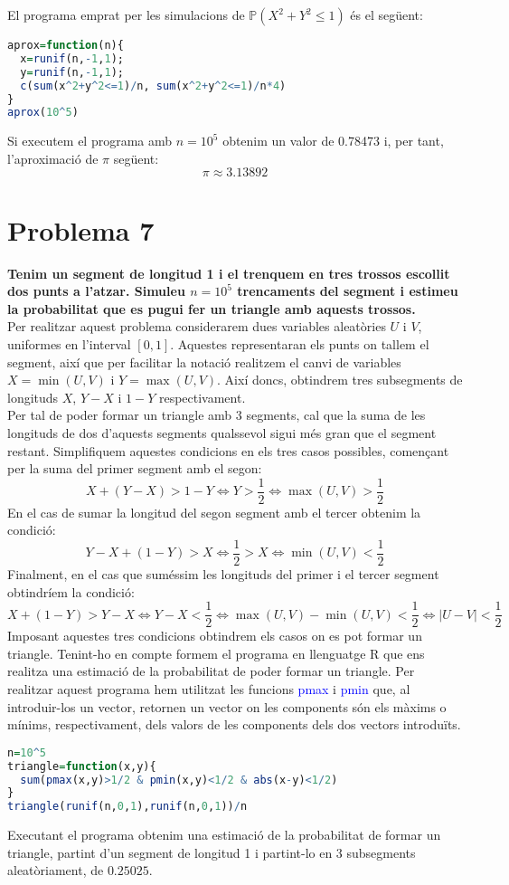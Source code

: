 \documentclass[11pt,a4paper]{article}
\begin{document}
El programa emprat per les simulacions de $\mathbb{P}(X^2+Y^2\leq1)$ és el següent:
\begin{lstlisting}[language=R,caption={Programa del problema 6},xleftmargin=.20\textwidth,xrightmargin=.20\textwidth]
aprox=function(n){
  x=runif(n,-1,1);
  y=runif(n,-1,1);
  c(sum(x^2+y^2<=1)/n, sum(x^2+y^2<=1)/n*4)
}
aprox(10^5)
\end{lstlisting}
Si executem el programa amb $n=10^5$ obtenim un valor de 0.78473 i, per tant, l'aproximació de $\pi$ següent: $$\pi\approx 3.13892$$

\section*{Problema 7}
\textbf{Tenim un segment de longitud 1 i el trenquem en tres trossos escollit dos punts a l'atzar. Simuleu $n=10^5$ trencaments del segment i estimeu la probabilitat que es pugui fer un triangle amb aquests trossos.}\\
Per realitzar aquest problema considerarem dues variables aleatòries $U$ i $V$, uniformes en l'interval $[0,1]$. Aquestes representaran els punts on tallem el segment, així que per facilitar la notació realitzem el canvi de variables $X=\min(U,V)$ i $Y=\max(U,V)$. Així doncs, obtindrem tres subsegments de longituds $X$, $Y-X$ i $1-Y$ respectivament.\\
Per tal de poder formar un triangle amb 3 segments, cal que la suma de les longituds de dos d'aquests segments qualssevol sigui més gran que el segment restant. Simplifiquem aquestes condicions en els tres casos possibles, començant per la suma del primer segment amb el segon:
$$X+(Y-X)>1-Y\Longleftrightarrow Y>\frac{1}{2}\Longleftrightarrow \max(U,V)>\frac{1}{2}$$
En el cas de sumar la longitud del segon segment amb el tercer obtenim la condició:
$$Y-X+(1-Y)>X\Longleftrightarrow\frac{1}{2}>X\Longleftrightarrow \min(U,V)<\frac{1}{2}$$
Finalment, en el cas que suméssim les longituds del primer i el tercer segment obtindríem la condició:
$$X+(1-Y)>Y-X\Longleftrightarrow Y-X<\frac{1}{2}\Longleftrightarrow \max(U,V)-\min(U,V)<\frac{1}{2}\Longleftrightarrow |U-V|<\frac{1}{2}$$
Imposant aquestes tres condicions obtindrem els casos on es pot formar un triangle. Tenint-ho en compte formem el programa en llenguatge R que ens realitza una estimació de la probabilitat de poder formar un triangle. Per realitzar aquest programa hem utilitzat les funcions \textcolor{blue}{pmax} i \textcolor{blue}{pmin} que, al introduir-los un vector, retornen un vector on les components són els màxims o mínims, respectivament, dels valors de les components dels dos vectors introduïts.
\begin{lstlisting}[language=R, caption={Programa formació de triangles},xleftmargin=.15\textwidth,xrightmargin=.15\textwidth]
n=10^5
triangle=function(x,y){
  sum(pmax(x,y)>1/2 & pmin(x,y)<1/2 & abs(x-y)<1/2)
}
triangle(runif(n,0,1),runif(n,0,1))/n
\end{lstlisting}
Executant el programa obtenim una estimació de la probabilitat de formar un triangle, partint d'un segment de longitud 1 i partint-lo en 3 subsegments aleatòriament, de $0.25025$.
\end{document}

